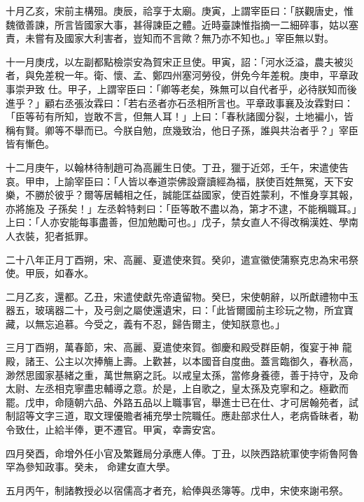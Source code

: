 \begin{pinyinscope}
 十月乙亥，宋前主構殂。庚辰，祫享于太廟。庚寅，上謂宰臣曰：「朕觀唐史，惟魏徵善諫，所言皆國家大事，甚得諫臣之體。近時臺諫惟指摘一二細碎事，姑以塞責，未嘗有及國家大利害者，豈知而不言歟？無乃亦不知也。」宰臣無以對。



 十一月庚戌，以左副都點檢崇安為賀宋正旦使。甲寅，詔：「河水泛溢，農夫被災者，與免差稅一年。衛、懷、孟、鄭四州塞河勞役，併免今年差稅。庚申，平章政事崇尹致
 仕。甲子，上謂宰臣曰：「卿等老矣，殊無可以自代者乎，必待朕知而後進乎？」顧右丞張汝霖曰：「若右丞者亦石丞相所言也。平章政事襄及汝霖對曰：「臣等茍有所知，豈敢不言，但無人耳！」上曰：「春秋諸國分裂，土地褊小，皆稱有賢。卿等不舉而已。今朕自勉，庶幾致治，他日子孫，誰與共治者乎？」宰臣皆有慚色。



 十二月庚午，以翰林待制趙可為高麗生日使。丁丑，獵于近郊，壬午，宋遣使告哀。甲申，上諭宰臣曰：「人皆以奉道崇佛設齋讀經為福，朕使百姓無冤，天下安樂，不勝於彼乎？爾等居輔相之任，誠能匡益國家，使百姓蒙利，不惟身享其報，亦將施及
 子孫矣！」左丞斡特剌曰：「臣等敢不盡以為，第才不逮，不能稱職耳。」上曰：「人亦安能每事盡善，但加勉勵可也。」戊子，禁女直人不得改稱漢姓、學南人衣裝，犯者抵罪。



 二十八年正月丁酉朔，宋、高麗、夏遣使來賀。癸卯，遣宣徽使蒲察克忠為宋弔祭使。甲辰，如春水。



 二月乙亥，還都。乙丑，宋遣使獻先帝遺留物。癸巳，宋使朝辭，以所獻禮物中玉器五，玻璃器二十，及弓劍之屬使還遺宋，曰：「此皆爾國前主珍玩之物，所宜寶藏，以無忘追慕。今受之，義有不忍，歸告爾主，使知朕意也。」



 三月丁酉朔，萬春節，宋、高麗、夏遣使來賀。御慶和殿受群臣朝，復宴于神
 龍殿，諸王、公主以次捧觴上壽。上歡甚，以本國音自度曲。蓋言臨御久，春秋高，渺然思國家基緒之重，萬世無窮之託。以戒皇太孫，當修身養德，善于持守，及命太尉、左丞相克寧盡忠輔導之意。於是，上自歌之，皇太孫及克寧和之。極歡而罷。戊申，命隨朝六品、外路五品以上職事官，舉進士已在仕、才可居翰苑者，試制詔等文字三道，取文理優贍者補充學士院職任。應赴部求仕人，老病昏昧者，勒令致仕，止給半俸，更不遷官。甲寅，幸壽安宮。



 四月癸酉，命增外任小官及繁難局分承應人俸。丁丑，以陜西路統軍使孛術魯阿魯罕為參知政事。癸未，
 命建女直大學。



 五月丙午，制諸教授必以宿儒高才者充，給俸與丞簿等。戊申，宋使來謝弔祭。




\end{pinyinscope}
